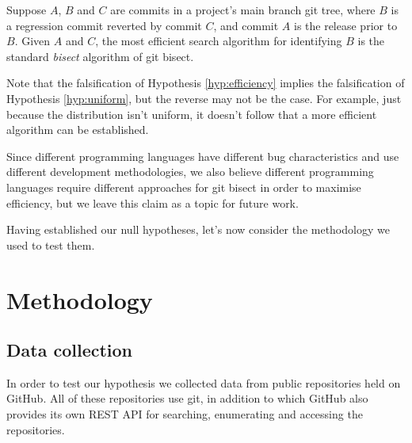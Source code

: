\documentclass[10pt,journal,compsoc]{IEEEtran}
\begin{document}
\begin{hypothesis}
\label{hyp:efficiency}
Suppose $A$, $B$ and $C$ are commits in a project's main branch git tree, where $B$ is a regression commit reverted by commit $C$, and commit $A$ is the release prior to $B$. Given $A$ and $C$, the most efficient search algorithm for identifying $B$ is the standard {\it bisect\/} algorithm of {\code git bisect}.
\end{hypothesis}

Note that the falsification of Hypothesis \ref{hyp:efficiency} implies the falsification of Hypothesis \ref{hyp:uniform}, but the reverse may not be the case. For example, just because the distribution isn't uniform, it doesn't follow that a more efficient algorithm can be established.

Since different programming languages have different bug characteristics \cite{nanz2015} and use different development methodologies, we also believe different programming languages require different approaches for {\code git bisect} in order to maximise efficiency, but we leave this claim as a topic for future work.

%

Having established our null hypotheses, let's now consider the methodology we used to test them.

\section{Methodology}

\subsection{Data collection}

In order to test our hypothesis we collected data from public repositories held on GitHub. All of these repositories use {\code git}, in addition to which GitHub also provides its own REST API for searching, enumerating and accessing the repositories.
\end{document}
